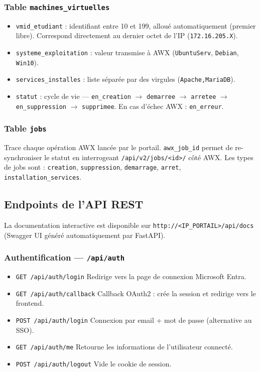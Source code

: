 \documentclass[a4paper]{article}
\newcommand{\cmd}[1]{\texttt{#1}}
\begin{document}
\subsubsection*{Table \texttt{machines\_virtuelles}}

\begin{itemize}
  \item \cmd{vmid\_etudiant} : identifiant entre 10 et 199, alloué automatiquement (premier libre). Correspond directement au dernier octet de l'IP (\cmd{172.16.205.X}).
  \item \cmd{systeme\_exploitation} : valeur transmise à AWX (\cmd{UbuntuServ}, \cmd{Debian}, \cmd{Win10}).
  \item \cmd{services\_installes} : liste séparée par des virgules (\cmd{Apache,MariaDB}).
  \item \cmd{statut} : cycle de vie --- \cmd{en\_creation} \(\to\) \cmd{demarree} \(\to\) \cmd{arretee} \(\to\) \cmd{en\_suppression} \(\to\) \cmd{supprimee}. En cas d'échec AWX : \cmd{en\_erreur}.
\end{itemize}

\subsubsection*{Table \texttt{jobs}}

Trace chaque opération AWX lancée par le portail. \cmd{awx\_job\_id} permet de re-synchroniser le statut en interrogeant \cmd{/api/v2/jobs/<id>/} côté AWX. Les types de jobs sont : \cmd{creation}, \cmd{suppression}, \cmd{demarrage}, \cmd{arret}, \cmd{installation\_services}.

\subsection{Endpoints de l'API REST}

La documentation interactive est disponible sur \cmd{http://<IP\_PORTAIL>/api/docs} (Swagger UI généré automatiquement par FastAPI).

\subsubsection*{Authentification --- \texttt{/api/auth}}

\begin{itemize}
  \item \cmd{GET /api/auth/login} \quad Redirige vers la page de connexion Microsoft Entra.
  \item \cmd{GET /api/auth/callback} \quad Callback OAuth2 : crée la session et redirige vers le frontend.
  \item \cmd{POST /api/auth/login} \quad Connexion par email + mot de passe (alternative au SSO).
  \item \cmd{GET /api/auth/me} \quad Retourne les informations de l'utilisateur connecté.
  \item \cmd{POST /api/auth/logout} \quad Vide le cookie de session.
\end{itemize}
\end{document}
